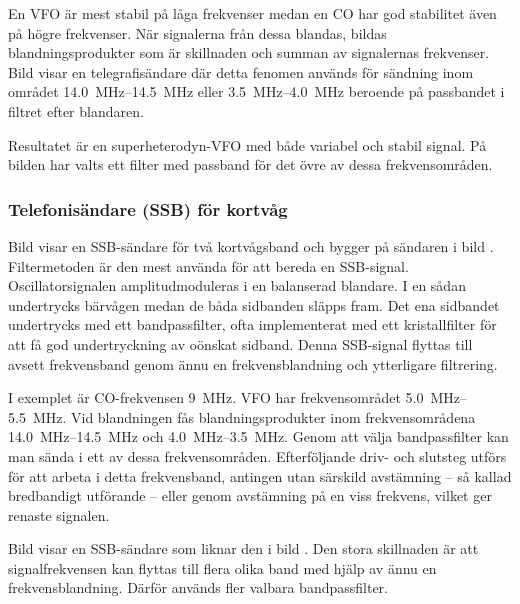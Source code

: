 En VFO är mest stabil på låga frekvenser medan en CO har god
stabilitet även på högre frekvenser.
När signalerna från dessa blandas, bildas blandningsprodukter som är
skillnaden och summan av signalernas frekvenser.
Bild  visar en telegrafisändare där detta fenomen används för
sändning inom området \SIrange{14,0}{14,5}{\mega\hertz} eller
\SIrange{3,5}{4,0}{\mega\hertz} beroende på passbandet i filtret efter
blandaren.

Resultatet är en superheterodyn-VFO med både variabel och stabil
signal.
På bilden har valts ett filter med passband för det övre av dessa
frekvensområden.

\subsubsection{Telefonisändare (SSB) för kortvåg}


Bild  visar en SSB-sändare för två kortvågsband och
bygger på sändaren i bild .
Filtermetoden är den mest använda för att bereda en SSB-signal.
Oscillatorsignalen amplitudmoduleras i en balanserad blandare.
I en sådan undertrycks bärvågen medan de båda sidbanden släpps fram.
Det ena sidbandet undertrycks med ett bandpassfilter, ofta implementerat med
ett kristallfilter för att få god undertryckning av oönskat sidband.
Denna SSB-signal flyttas till avsett frekvensband
genom ännu en frekvensblandning och ytterligare filtrering.

I exemplet är CO-frekvensen \qty{9}{\mega\hertz}.
VFO har frekvensområdet \SIrange{5,0}{5,5}{\mega\hertz}.
Vid blandningen fås blandningsprodukter inom frekvensområdena
\SIrange{14,0}{14,5}{\mega\hertz} och \SIrange{4,0}{3,5}{\mega\hertz}.
Genom att välja bandpassfilter kan man sända i ett av dessa frekvensområden.
Efterföljande driv- och slutsteg utförs för att arbeta i detta frekvensband,
antingen utan särskild avstämning -- så kallad bredbandigt utförande -- eller
genom avstämning på en viss frekvens, vilket ger renaste signalen.

Bild  visar en SSB-sändare som liknar den i
bild .
Den stora skillnaden är att signalfrekvensen kan flyttas till flera olika band
med hjälp av ännu en frekvensblandning.
Därför används fler valbara bandpassfilter.

